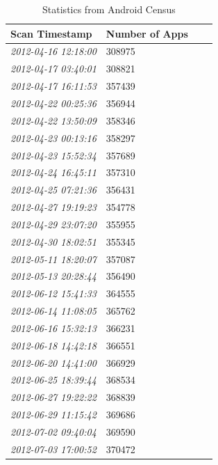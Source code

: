 \begin{table}[h]
\begin{small}
\begin{tabular}{l|lll}
Scan Timestamp & Number of Apps &  \\
\hline

\textit{2012-04-16 12:18:00} & 308975 \\
\textit{2012-04-17 03:40:01} & 308821 \\
\textit{2012-04-17 16:11:53} & 357439 \\
\textit{2012-04-22 00:25:36} & 356944 \\
\textit{2012-04-22 13:50:09} & 358346 \\
\textit{2012-04-23 00:13:16} & 358297 \\
\textit{2012-04-23 15:52:34} & 357689 \\
\textit{2012-04-24 16:45:11} & 357310 \\
\textit{2012-04-25 07:21:36} & 356431 \\
\textit{2012-04-27 19:19:23} & 354778 \\
\textit{2012-04-29 23:07:20} & 355955 \\
\textit{2012-04-30 18:02:51} & 355345 \\
\textit{2012-05-11 18:20:07} & 357087 \\
\textit{2012-05-13 20:28:44} & 356490 \\
\textit{2012-06-12 15:41:33} & 364555 \\
\textit{2012-06-14 11:08:05} & 365762 \\
\textit{2012-06-16 15:32:13} & 366231 \\
\textit{2012-06-18 14:42:18} & 366551 \\
\textit{2012-06-20 14:41:00} & 366929 \\
\textit{2012-06-25 18:39:44} & 368534 \\
\textit{2012-06-27 19:22:22} & 368839 \\
\textit{2012-06-29 11:15:42} & 369686 \\
\textit{2012-07-02 09:40:04} & 369590 \\
\textit{2012-07-03 17:00:52} & 370472 \\

\end{tabular}
\end{small}
\caption{Statistics from Android Census}
\label{tab:marketstats}
\end{table}


